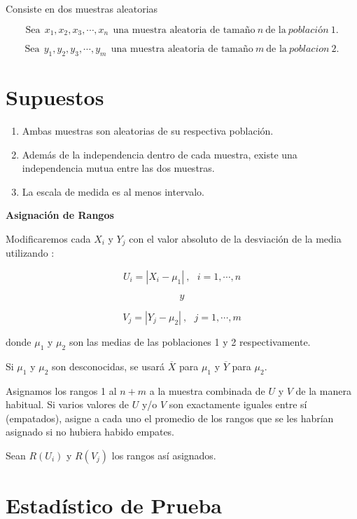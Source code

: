 \documentclass[
  a4paper,
  oneside,
  openany]{book}
\begin{document}
Consiste en dos muestras aleatorias

\[\mbox{Sea} \ \ x_{1},x_{2},x_{3},\cdots,x_{n} \ \ \mbox{una muestra aleatoria de tamaño} \  n  \ \mbox{de la} \ población \ 1.\]

\[\mbox{Sea} \ \ y_{1},y_{2},y_{3},\cdots,y_{m} \ \ \mbox{una muestra aleatoria de tamaño} \ m \  \mbox{de la} \ poblacion\ 2.\]

\hypertarget{supuestos-8}{%
\section{Supuestos}\label{supuestos-8}}

\begin{enumerate}
\def\labelenumi{\arabic{enumi})}
\item
  Ambas muestras son aleatorias de su respectiva población.
\item
  Además de la independencia dentro de cada muestra, existe una independencia mutua entre las dos muestras.
\item
  La escala de medida es al menos intervalo.
\end{enumerate}

\textbf{Asignación de Rangos}

Modificaremos cada \(X_{i}\) y \(Y_{j}\) con el valor absoluto de la desviación de la media utilizando :

\[U_{i} = |X_{i}-\mu_{1}| \ , \ \ \ i=1,\cdots,n\]

\[y\]

\[V_{j} = |Y_{j}-\mu_{2}|\  ,\ \ \ j=1,\cdots,m\]

donde \(\mu_{1}\) y \(\mu_{2}\) son las medias de las poblaciones 1 y 2 respectivamente.

Si \(\mu_{1}\) y \(\mu_{2}\) son desconocidas, se usará \(\overline{X}\) para \(\mu_{1}\) y \(\overline{Y}\) para \(\mu_{2}\).

Asignamos los rangos 1 al \(n + m\) a la muestra combinada de \(U\) y \(V\) de la manera habitual.
Si varios valores de \(U\) y/o \(V\) son exactamente iguales entre sí (empatados), asigne a cada uno el promedio de los rangos que se les habrían asignado si no hubiera habido empates.

Sean \(R(U_{i})\) y \(R(V_{j})\) los rangos así asignados.

\hypertarget{estaduxedstico-de-prueba-7}{%
\section{Estadístico de Prueba}\label{estaduxedstico-de-prueba-7}}
\end{document}
